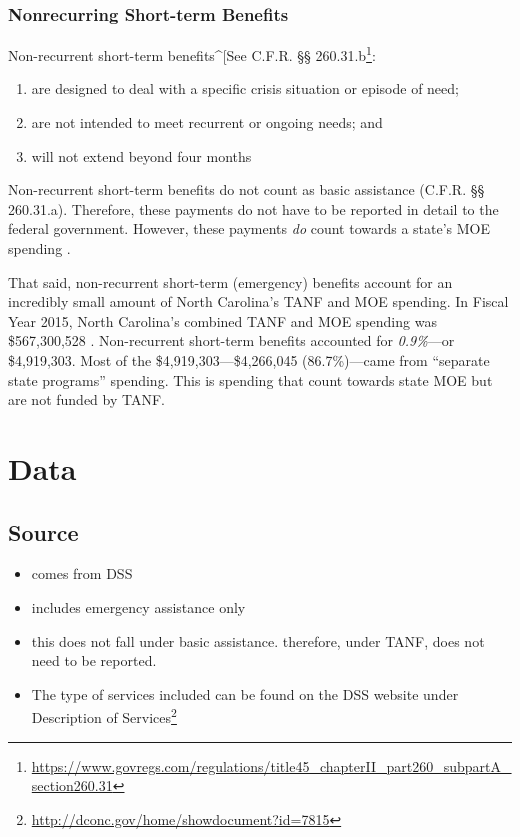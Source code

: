 \documentclass[12pt,letterpaperpaper,]{book}
\providecommand{\tightlist}{%
  \setlength{\itemsep}{0pt}\setlength{\parskip}{0pt}}
\renewcommand{\href}[2]{#2\footnote{\url{#1}}}
\begin{document}
\subsection{Nonrecurring Short-term
Benefits}\label{nonrecurring-short-term-benefits}

Non-recurrent short-term benefits\^{}{[}See
\href{https://www.govregs.com/regulations/title45_chapterII_part260_subpartA_section260.31}{C.F.R.
§§ 260.31.b}:

\begin{enumerate}
\def\labelenumi{\arabic{enumi}.}
\tightlist
\item
  are designed to deal with a specific crisis situation or episode of
  need;\\
\item
  are not intended to meet recurrent or ongoing needs; and
\item
  will not extend beyond four months
\end{enumerate}

Non-recurrent short-term benefits do not count as basic assistance
(C.F.R. §§ 260.31.a). Therefore, these payments do not have to be
reported in detail to the federal government. However, these payments
\emph{do} count towards a state's MOE spending \citep{schott_how_2015}.

That said, non-recurrent short-term (emergency) benefits account for an
incredibly small amount of North Carolina's TANF and MOE spending. In
Fiscal Year 2015, North Carolina's combined TANF and MOE spending was
\$567,300,528 \citep{us_dhhs_tanf_2015-1}. Non-recurrent short-term
benefits accounted for \emph{0.9\%}---or \$4,919,303. Most of the
\$4,919,303---\$4,266,045 (86.7\%)---came from ``separate state
programs'' spending. This is spending that count towards state MOE but
are not funded by TANF.

\chapter*{Data}\label{data-2}

\section{Source}\label{source}

\begin{itemize}
\tightlist
\item
  comes from DSS
\item
  includes emergency assistance only
\item
  this does not fall under basic assistance. therefore, under TANF, does
  not need to be reported.
\item
  The type of services included can be found on the DSS website under
  \href{http://dconc.gov/home/showdocument?id=7815}{Description of
  Services}
\end{itemize}
\end{document}

